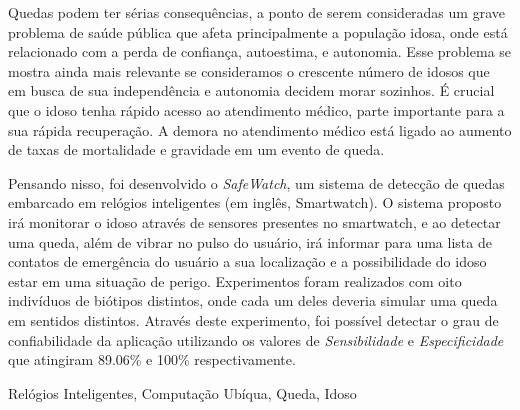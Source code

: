 Quedas podem ter sérias consequências, a ponto de serem consideradas um grave problema de saúde pública que afeta principalmente a população idosa, onde está relacionado com a perda de confiança, autoestima, e autonomia. Esse problema se mostra ainda mais relevante se consideramos o crescente número de idosos que em busca de sua independência e autonomia decidem morar sozinhos. É crucial que o idoso tenha rápido acesso ao atendimento médico, parte importante para a sua rápida recuperação. A demora no atendimento médico está ligado ao aumento de taxas de mortalidade e gravidade em um evento de queda. 

Pensando nisso, foi desenvolvido o \textit{SafeWatch}, um sistema de detecção de quedas embarcado em relógios inteligentes (em inglês, Smartwatch). O sistema proposto irá monitorar o idoso através de sensores presentes no smartwatch, e ao detectar uma queda, além de vibrar no pulso do usuário, irá informar para uma lista de contatos de emergência do usuário a sua localização e a possibilidade do idoso estar em uma situação de perigo. Experimentos foram realizados com oito indivíduos de biótipos distintos, onde cada um deles deveria simular uma queda em sentidos distintos. Através deste experimento, foi possível detectar o grau de confiabilidade da aplicação utilizando os valores de \textit{Sensibilidade} e \textit{Especificidade} que atingiram 89.06\% e 100\% respectivamente.




\begin{keywords}
	Relógios Inteligentes, Computação Ubíqua, Queda, Idoso
\end{keywords}